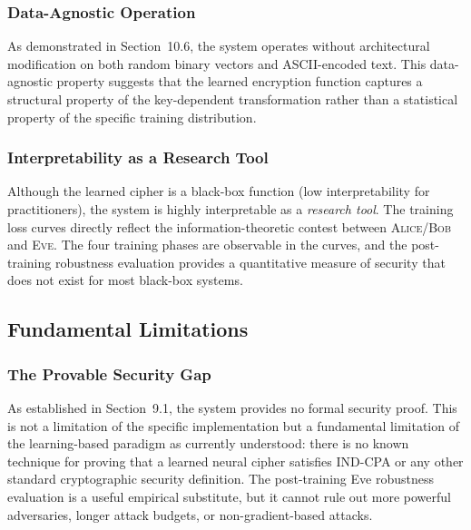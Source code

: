 \documentclass[12pt, a4paper]{article}
\newcommand{\alice}{\textsc{Alice}}
\newcommand{\bob}{\textsc{Bob}}
\newcommand{\eve}{\textsc{Eve}}
\begin{document}
\subsubsection*{Data-Agnostic Operation}

As demonstrated in Section~10.6, the system operates without
architectural modification on both random binary vectors and
ASCII-encoded text. This data-agnostic property suggests that the learned
encryption function captures a structural property of the key-dependent
transformation rather than a statistical property of the specific
training distribution.

\subsubsection*{Interpretability as a Research Tool}

Although the learned cipher is a black-box function (low interpretability
for practitioners), the system is highly interpretable as a
\emph{research tool}. The training loss curves directly reflect the
information-theoretic contest between \alice{}/\bob{} and \eve{}.
The four training phases are observable in the curves, and the
post-training robustness evaluation provides a quantitative measure
of security that does not exist for most black-box systems.

\subsection{Fundamental Limitations}
\label{subsec:fundamental_limitations}

\subsubsection*{The Provable Security Gap}

As established in Section~9.1, the system provides no formal security
proof. This is not a limitation of the specific implementation but a
fundamental limitation of the learning-based paradigm as currently
understood: there is no known technique for proving that a learned
neural cipher satisfies IND-CPA or any other standard cryptographic
security definition. The post-training Eve robustness evaluation is a
useful empirical substitute, but it cannot rule out more powerful
adversaries, longer attack budgets, or non-gradient-based attacks.
\end{document}
